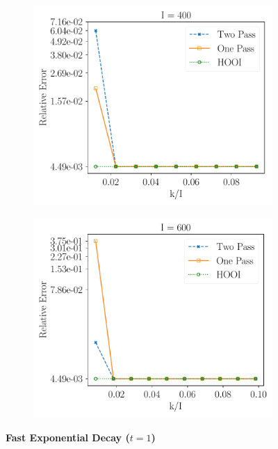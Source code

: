\begin{figure}[H]
\begin{subfigure}{0.32\textwidth}
    \includegraphics[scale = 0.3]{figure/fed_n400.pdf}
    \end{subfigure}
    \begin{subfigure}{0.32\textwidth}
    \includegraphics[scale = 0.3]{figure/fed_n600.pdf}
    \end{subfigure}
\textbf{Fast Exponential Decay ($t = 1$)}\\
    \centering 
    \begin{subfigure}{0.32\textwidth}

\end{subfigure}
\end{figure}
